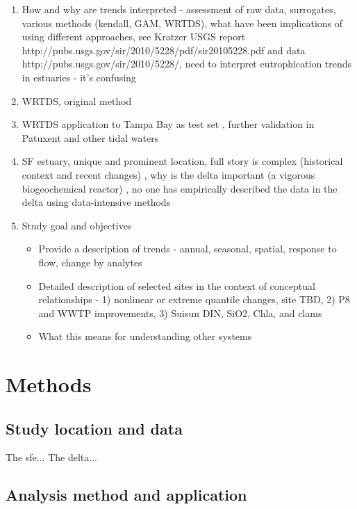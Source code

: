 \documentclass[letterpaper,12pt,oneside]{article}\usepackage[]{graphicx}\usepackage[]{color}
\begin{document}
\begin{enumerate}
\item How and why are trends interpreted - assessment of raw data, surrogates, various methods (kendall, GAM, WRTDS), what have been implications of using different approaches, see Kratzer USGS report http://pubs.usgs.gov/sir/2010/5228/pdf/sir20105228.pdf and data http://pubs.usgs.gov/sir/2010/5228/, need to interpret eutrophication trends in estuaries - it's confusing \citep{Cloern10}
\item WRTDS, original method \citep{Hirsch10,Hirsch15}
\item WRTDS application to Tampa Bay as test set \citep{Beck15}, further validation in Patuxent and other tidal waters \cite{Beck15b}
\item SF estuary, unique and prominent location, full story is complex (historical context and recent changes) \citep{Cloern12b}, why is the delta important (a vigorous biogeochemical reactor) \citep{Jassby00,Jassby02,Jassby08}, no one has empirically described the data in the delta using data-intensive methods
\item Study goal and objectives
\begin{itemize}
\item Provide a description of trends - annual, seasonal, spatial, response to flow, change by analytes
\item Detailed description of selected sites in the context of conceptual relationships - 1) nonlinear or extreme quantile changes, site TBD, 2) P8 and WWTP improvements, 3) Suisun DIN, SiO2, Chla, and clams
\item What this means for understanding other systems
\end{itemize}
\end{enumerate}

\section{Methods}

\subsection{Study location and data}

The \ac{sfe}... The delta...

\subsection{Analysis method and application}
\end{document}
